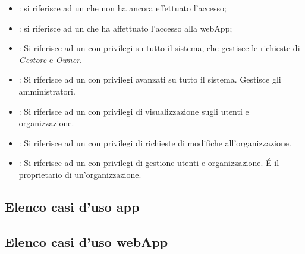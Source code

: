 \documentclass[../analisi-dei-requisiti]{subfiles}
\begin{document}
\begin{itemize}
  \item \textbf{}: si riferisce ad un  che non ha ancora effettuato l'accesso;
  \item \textbf{}: si riferisce ad un  che ha affettuato l'accesso alla webApp;
  \item \textbf{}: Si riferisce ad un  con privilegi su tutto il sistema, che gestisce le richieste di \emph{Gestore} e \emph{Owner}.
  \item \textbf{}: Si riferisce ad un  con privilegi avanzati su tutto il sistema. Gestisce gli amministratori.
  \item \textbf{}: Si riferisce ad un  con privilegi di visualizzazione sugli utenti e organizzazione.
  \item \textbf{}: Si riferisce ad un  con privilegi di richieste di modifiche all'organizzazione.
  \item \textbf{}: Si riferisce ad un  con privilegi di gestione utenti e organizzazione. É il proprietario di un'organizzazione.
\end{itemize}


\subsection{Elenco casi d'uso app}
\label{sub:casi_duso_app}

\subsection{Elenco casi d'uso webApp}
\label{sub:casi_duso_webApp}

\end{document}
